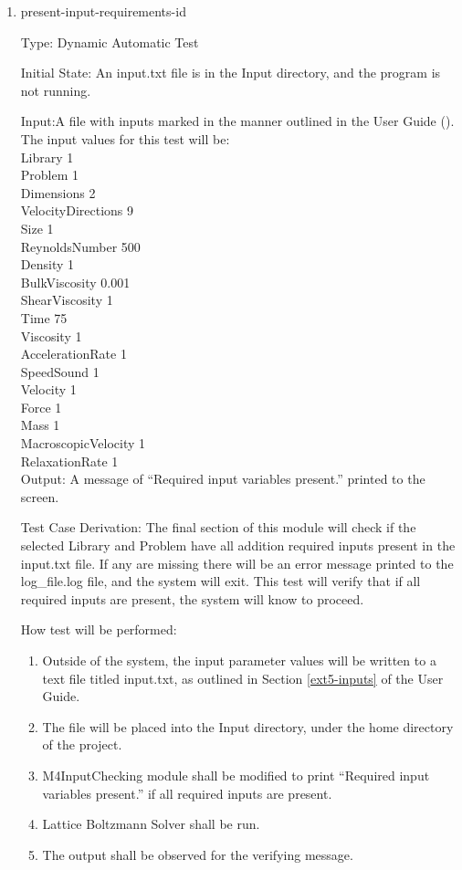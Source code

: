 \documentclass[12pt, titlepage]{article}
\newcommand{\myprogname}{Lattice Boltzmann Solver}
\newcounter{uvtestcounter} %
\begin{document}
\begin{enumerate}
	\item{present-input-requirements-id\theuvtestcounter\\}

Type: Dynamic Automatic Test

Initial State: An input.txt file is in the Input directory, and the program is not running.

Input:A file with inputs marked in the manner outlined in the
User Guide (\citet{LBM_UserGuide_PM}).\\The input values for this test will
be:\\

Library 1\\
Problem 1\\
Dimensions 2\\
VelocityDirections 9\\
Size 1\\
ReynoldsNumber 500\\
Density 1\\
BulkViscosity 0.001\\
ShearViscosity 1\\
Time 75\\
Viscosity 1\\
AccelerationRate 1\\
SpeedSound 1\\
Velocity 1\\
Force 1\\
Mass 1\\
MacroscopicVelocity 1\\
RelaxationRate 1\\

Output: A message of ``Required input variables present.'' printed to the screen.

Test Case Derivation: The final section of this module will check if the selected Library and Problem have all addition required inputs present in the input.txt file. If any are missing there will be an error message printed to the log\_file.log file, and the system will exit. This test will verify that if all required inputs are present, the system will know to proceed. 

How test will be performed: 
\begin{enumerate}
	\item Outside of the system, the input parameter values will be written to a text file titled input.txt, as outlined in Section \ref{ext5-inputs} of the User Guide.
	\item The file will be placed into the Input directory, under the home directory of the project.
	\item M4InputChecking module shall be modified to print ``Required input variables present.'' if all required inputs are present.
	\item {\myprogname} shall be run. 
	\item The output shall be observed for the verifying message.
\end{enumerate}
\end{enumerate}
\end{document}
